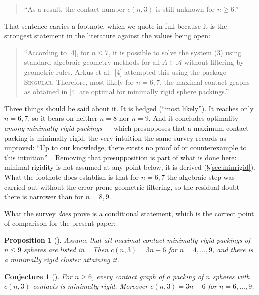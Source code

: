 \documentclass[11pt,a4paper]{article}
\theoremstyle{plain}
\newtheorem{proposition}[theorem]{Proposition}
\newtheorem{conjecture}[theorem]{Conjecture}
\theoremstyle{definition}
\begin{document}
\begin{quote}
``As a result, the contact number $c(n,3)$ is still unknown for $n \ge
6$.''~\cite[\S5.1]{BezdekKhan2018}
\end{quote}

\noindent That sentence carries a footnote, which we quote in full because it is the
strongest statement in the literature against the values being open:

\begin{quote}
``According to [4], for $n \le 7$, it is possible to solve the system (3) using standard
algebraic geometry methods for all $A \in \mathcal{A}$ without filtering by geometric
rules. Arkus et al.\ [4] attempted this using the package \textsc{Singular}. Therefore,
most likely for $n = 6, 7$, the maximal contact graphs as obtained in [4] are optimal for
minimally rigid sphere packings.''~\cite[\S5.1, footnote 2]{BezdekKhan2018}
\end{quote}

\noindent Three things should be said about it. It is hedged (``most likely''). It
reaches only $n = 6, 7$, so it bears on neither $n = 8$ nor $n = 9$. And it concludes
optimality \emph{among minimally rigid packings} --- which presupposes that a
maximum-contact packing is minimally rigid, the very intuition the same survey records as
unproved: ``Up to our knowledge, there exists no proof of or counterexample to this
intuition''~\cite[\S5.1]{BezdekKhan2018}. Removing that presupposition is part of what is
done here: minimal rigidity is not assumed at any point below, it is derived
(\S\ref{sec:minrigid}). What the footnote does establish is that for $n = 6, 7$ the
algebraic step was carried out without the error-prone geometric filtering, so the
residual doubt there is narrower than for $n = 8, 9$.

What the survey \emph{does} prove is a conditional statement, which is the correct
point of comparison for the present paper:

\begin{proposition}[{\cite[Prop.~5.1]{BezdekKhan2018}}]
\label{prop:bk}
Assume that all maximal-contact minimally rigid packings of $n \le 9$ spheres are
listed in~\cite{ArkusPRL2009,ArkusSIAM2011}. Then $c(n,3) = 3n-6$ for
$n = 4,\dots,9$, and there is a minimally rigid cluster attaining it.
\end{proposition}

\begin{conjecture}[{\cite[Conj.~5.2]{BezdekKhan2018}}]
\label{conj:bk}
For $n \ge 6$, every contact graph of a packing of $n$ spheres with $c(n,3)$ contacts
is minimally rigid. Moreover $c(n,3) = 3n-6$ for $n = 6,\dots,9$.
\end{conjecture}
\end{document}
